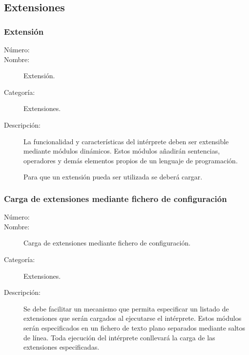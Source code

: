 \subsection{Extensiones}
\subsubsection{Extensión}
\begin{framed}
	\begin{description}
		\item [Número:] \cn
		\item [Nombre:] Extensión.
		\item [Categoría:] Extensiones.
		\item [Descripción:] La funcionalidad y características del intérprete deben ser extensible mediante módulos dinámicos. 
      Estos módulos añadirán sentencias, operadores y demás elementos propios de un lenguaje de programación. 
      
      Para que un extensión pueda ser utilizada se deberá cargar. 
	\end{description}
\end{framed}

\subsubsection{Carga de extensiones mediante fichero de configuración}
\begin{framed}
	\begin{description}
		\item [Número:] \cn
		\item [Nombre:] Carga de extensiones mediante fichero de configuración.
		\item [Categoría:] Extensiones.
		\item [Descripción:] Se debe facilitar un mecanismo que permita especificar un listado de extensiones que serán cargados al ejecutarse
      el intérprete. Estos módulos serán especificados en un fichero de texto plano separados mediante saltos de línea. Toda ejecución del intérprete
      conllevará la carga de las extensiones especificadas.
	\end{description}
\end{framed}

